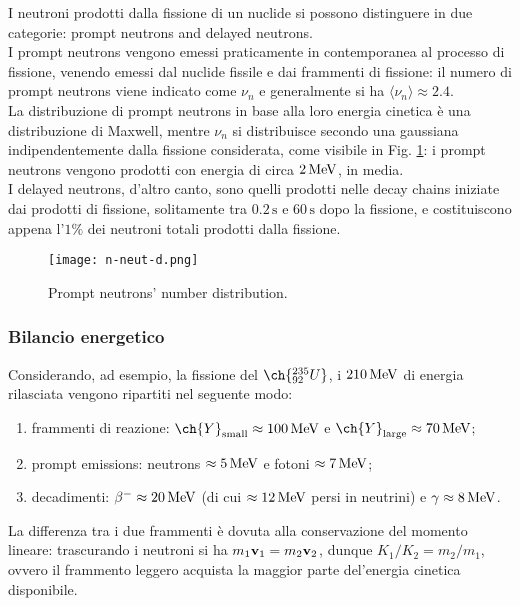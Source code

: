 I neutroni prodotti dalla fissione di un nuclide si possono distinguere in due categorie: prompt neutrons and delayed neutrons.\\
I prompt neutrons vengono emessi praticamente in contemporanea al processo di fissione, venendo emessi dal nuclide fissile e dai frammenti di fissione: il numero di prompt neutrons viene indicato come $ \nu_n $ e generalmente si ha $ \langle \nu_n \rangle \approx 2.4 $.\\
La distribuzione di prompt neutrons in base alla loro energia cinetica è una distribuzione di Maxwell, mentre $ \nu_n $ si distribuisce secondo una gaussiana indipendentemente dalla fissione considerata, come visibile in Fig. \ref{n-neut-dist}: i prompt neutrons vengono prodotti con energia di circa $ 2\,\text{MeV} $, in media.\\
I delayed neutrons, d'altro canto, sono quelli prodotti nelle decay chains iniziate dai prodotti di fissione, solitamente tra $ 0.2\,\text{s} $ e $ 60\,\text{s} $ dopo la fissione, e costituiscono appena l'$ 1\% $ dei neutroni totali prodotti dalla fissione.

\begin{figure}[!b]
	\centering
	\texttt{[image: n-neut-d.png]}
	\caption{Prompt neutrons' number distribution.}
	\label{n-neut-dist}
\end{figure}

\subsubsection{Bilancio energetico}

Considerando, ad esempio, la fissione del $ \ch{^{235}_{92} U} $, i $ 210\,\text{MeV} $ di energia rilasciata vengono ripartiti nel seguente modo:
\begin{enumerate}
	\item frammenti di reazione: $ \ch{Y}_{\text{small}} \approx 100\mev $ e $ \ch{Y}_{\text{large}} \approx 70\mev $;
	\item prompt emissions: neutrons $ \approx 5\,\text{MeV} $ e fotoni $ \approx 7\,\text{MeV} $;
	\item decadimenti: $ \beta^- \approx 20\,\text{MeV} $ (di cui $ \approx 12\,\text{MeV} $ persi in neutrini) e $ \gamma \approx 8\,\text{MeV} $.
\end{enumerate}
La differenza tra i due frammenti è dovuta alla conservazione del momento lineare: trascurando i neutroni si ha $ m_1 \mathbf{v}_1 = m_2 \mathbf{v}_2 $, dunque $ K_1 / K_2 = m_2 / m_1 $, ovvero il frammento leggero acquista la maggior parte del'energia cinetica disponibile.


